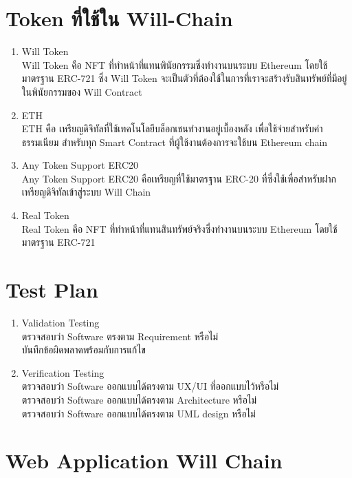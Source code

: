 \documentclass[12pt,oneside,openright,a4paper]{cpe-thai-project}
\begin{document}
\section{Token ที่ใช้ใน Will-Chain}
\begin{enumerate}[label=\thesection.\arabic*,leftmargin=0pt,itemindent=1.25cm]
	\item Will Token \\
			\tab \tab  Will Token คือ NFT ที่ทำหน้าที่แทนพินัยกรรมซึ่งทำงานบนระบบ Ethereum โดยใช้มาตรฐาน ERC-721 ซึ่ง Will Token จะเป็นตัวที่ต้องใช้ในการที่เราจะสร้างรับสินทรัพย์ที่มีอยู่ในพินัยกรรมของ Will Contract
	\item ETH \\
			\tab \tab ETH คือ เหรียญดิจิทัลที่ใช้เทคโนโลยีบล็อกเชนทำงานอยู่เบื้องหลัง เพื่อใช้จ่ายสำหรับค่าธรรมเนียม สำหรับทุก Smart Contract ที่ผู้ใช้งานต้องการจะใช้บน Ethereum chain
	\item Any Token Support ERC20\\
			\tab \tab Any Token Support ERC20 คือเหรียญที่ใช้มาตรฐาน ERC-20 ที่ซึ่งใช้เพื่อสำหรับฝากเหรียญดิจิทัลเข้าสู่ระบบ Will Chain
\item Real Token	\\		
\tab \tab Real Token คือ NFT ที่ทำหน้าที่แทนสินทรัพย์จริงซึ่งทำงานบนระบบ Ethereum โดยใช้มาตรฐาน ERC-721 
	\end{enumerate}
\section{Test Plan}
\begin{enumerate}[label=\thesection.\arabic*,leftmargin=0pt,itemindent=1.25cm]
\item Validation Testing \\
\tab \tab ตรวจสอบว่า Software ตรงตาม Requirement หรือไม่\\
\tab \tab บันทึกข้อผิดพลาดพร้อมกับการแก้ไข
\item Verification Testing \\
\tab \tab ตรวจสอบว่า Software ออกแบบได้ตรงตาม UX/UI ที่ออกแบบไว้หรือไม่\\
\tab \tab ตรวจสอบว่า Software ออกแบบได้ตรงตาม Architecture หรือไม่\\
\tab \tab ตรวจสอบว่า Software ออกแบบได้ตรงตาม UML design หรือไม่\\
\end{enumerate}
\clearpage
\section{Web Application Will Chain}
\end{document}
